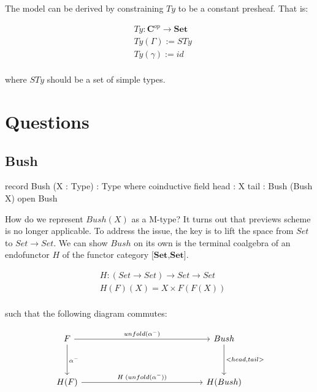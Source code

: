 The model can be derived by constraining $Ty$ to be a constant presheaf. That is:

\begin{align*}
  & Ty : \textbf{C}^{op} \to \textbf{Set} \\
  & Ty(\Gamma) := STy \\
  & Ty(\gamma) := id \\
\end{align*}

where $STy$ should be a set of simple types.

\section{Questions}

\subsection{Bush}

\begin{code}
record Bush (X : Type) : Type where
  coinductive
  field
    head : X
    tail : Bush (Bush X)
open Bush
\end{code}

How do we represent $Bush(X)$ as a M-type? It turns out that previews scheme is no longer applicable. To address the issue, the key is to lift the space from $Set$ to $Set \to Set$. We can show $Bush$ on its own is the terminal coalgebra of an endofunctor $H$ of the functor category $\textbf{[Set,Set]}$.

\begin{align*}
& H : (Set \to Set) \to Set \to Set \\
& H (F) (X) = X \times F (F (X)) \\
\end{align*}

such that the following diagram commutes:

\[
\begin{tikzcd}[row sep=huge, column sep=5.0cm]
F \arrow[r, "unfold(\alpha^{-})"] \arrow[d, "\alpha^{-}"]
& Bush \arrow[d, "{<head,tail>}"] \\
H(F) \arrow[r, "H\;(unfold(\alpha^{-}))"]
& H(Bush)
\end{tikzcd}
\]